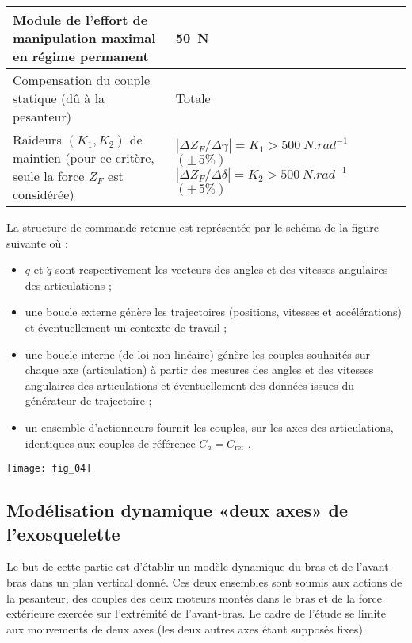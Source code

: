 \begin{multicols}{2}
\begin{center}
\begin{tabular}{|p{.45\linewidth}|p{.45\linewidth}|}
\hline
Module de l’effort de manipulation maximal en régime permanent & \SI{50}{N} \\
\hline
Compensation du couple statique (dû à la pesanteur) & Totale \\ \hline
Raideurs $(K_1,K_2)$ de maintien (pour ce critère, seule la force $Z_F$ est
considérée) & $\left | \Delta Z_F / \Delta \gamma \right | = K_1 > \SI{500}{N.rad^{-1}}$ $(\pm\,5\%)$ 
$\left | \Delta Z_F / \Delta \delta \right  | = K_2 > \SI{500}{N.rad^{-1}}$ $(\pm\,5\%)$ \\
\hline
\end{tabular}
\end{center}


La structure de commande retenue est représentée par le schéma de la figure suivante où :
\begin{itemize}
\item $q$ et $\dot{q}$ sont respectivement les vecteurs des angles et des vitesses angulaires des articulations ;
\item une boucle externe génère les trajectoires (positions, vitesses et accélérations) et éventuellement un contexte de travail ;
\item une boucle interne (de loi non linéaire) génère les couples souhaités sur chaque axe (articulation) à partir des mesures des angles et des vitesses angulaires des articulations et éventuellement des données issues du générateur de trajectoire ;
\item  un ensemble d’actionneurs fournit les couples, sur les axes des articulations, identiques aux couples de
référence $C_a = C_{\text{ref}}$ .
\end{itemize}

\begin{center}
\texttt{[image: fig\_04]}
\end{center}

\newpage

\subsection*{Modélisation dynamique «deux axes» de l’exosquelette}

\begin{obj}
Le but de cette partie est d’établir un modèle dynamique du bras et de l’avant-bras dans un plan vertical
donné. Ces deux ensembles sont soumis aux actions de la pesanteur, des couples des deux moteurs montés
dans le bras et de la force extérieure exercée sur l’extrémité de l’avant-bras. Le cadre de l’étude se limite
aux mouvements de deux axes (les deux autres axes étant supposés fixes).
\end{obj}


\end{multicols}
